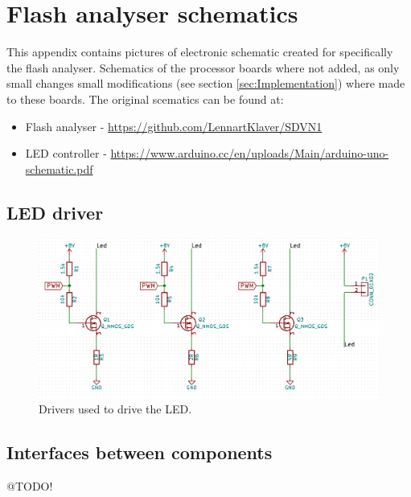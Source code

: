 \chapter{Flash analyser schematics}
\label{app_schematics}
This appendix contains pictures of electronic schematic created for specifically the flash analyser. Schematics of the processor boards where not added, as only small changes small modifications (see section \ref{sec:Implementation}) where made to these boards. The original scematics can be found at:
\begin{itemize}
    \item Flash analyser - \url{https://github.com/LennartKlaver/SDVN1} 
    \item LED controller - \url{https://www.arduino.cc/en/uploads/Main/arduino-uno-schematic.pdf}
\end{itemize}


\section{LED driver}
\begin{figure}[!h]
	\includegraphics[width=\textwidth]{pics/LED_Driver.png}
	\caption{Drivers used to drive the LED.}
	\label{fig:LED_Driver}
\end{figure}

\section{Interfaces between components}
@TODO!